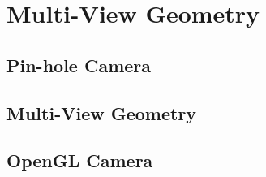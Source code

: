 \chapter{Multi-View Geometry}
\section{Pin-hole Camera}
\section{Multi-View Geometry}
\section{OpenGL Camera}
